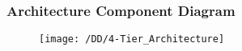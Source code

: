 \subsubsection{Architecture Component Diagram}
\begin{figure}[!ht]
  \centering
  \vspace{0.2cm}
  \texttt{[image: /DD/4-Tier\_Architecture]}\\
  \vspace{0.4cm}
  \label{fig:4-Tier_Architecture} 
\end{figure}